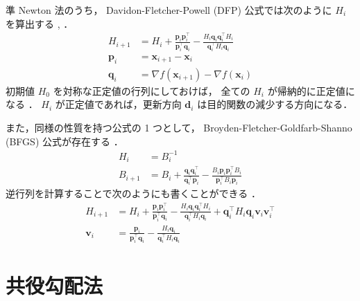 準 Newton 法のうち，
Davidon-Fletcher-Powell (DFP) 公式では次のように $H_i$ を算出する
\cite[Section 9.3]{Luenberger2003}, \cite[Section 10.9]{Press2007}．
\begin{align}
    H_{i+1}  & = H_i + \frac{\bm{p}_i \bm{p}_i^\top}{\bm{p}_i^\top \bm{q}_i}
    - \frac{H_i \bm{q}_i \bm{q}_i^\top H_i}{\bm{q}_i^\top H_i \bm{q}_i}      \\
    \bm{p}_i & = \bm{x}_{i+1} - \bm{x}_i                                     \\
    \bm{q}_i & = \nabla f(\bm{x}_{i+1}) - \nabla f(\bm{x}_i)
\end{align}
初期値 $H_0$ を対称な正定値の行列にしておけば，
全ての $H_i$ が帰納的に正定値になる
\cite[Section 9.3]{Luenberger2003}．
$H_i$ が正定値であれば，更新方向 $\bm{d}_i$ は目的関数の減少する方向になる．

また，同様の性質を持つ公式の 1 つとして，
Broyden-Fletcher-Goldfarb-Shanno (BFGS) 公式が存在する
\cite[Section 9.4]{Luenberger2003}．
\begin{align}
    H_i     & = B_i^{-1}                                                    \\
    B_{i+1} & = B_i + \frac{\bm{q}_i \bm{q}_i^\top}{\bm{q}_i^\top \bm{p}_i}
    - \frac{B_i \bm{p}_i \bm{p}_i^\top B_i}{\bm{p}_i^\top B_i \bm{p}_i}
\end{align}
逆行列を計算することで次のようにも書くことができる
\cite[Section 10.9]{Press2007}．
\begin{align}
    H_{i+1}  & = H_i + \frac{\bm{p}_i \bm{p}_i^\top}{\bm{p}_i^\top \bm{q}_i}
    - \frac{H_i \bm{q}_i \bm{q}_i^\top H_i}{\bm{q}_i^\top H_i \bm{q}_i}
    + \bm{q}_i^\top H_i \bm{q}_i \bm{v}_i \bm{v}_i^\top                      \\
    \bm{v}_i & = \frac{\bm{p}_i}{\bm{p}_i^\top \bm{q}_i}
    - \frac{H_i \bm{q}_i}{\bm{q}_i^\top H_i \bm{q}_i}
\end{align}

\section{共役勾配法}\label{sec:optimization_conjugate-gradient}

